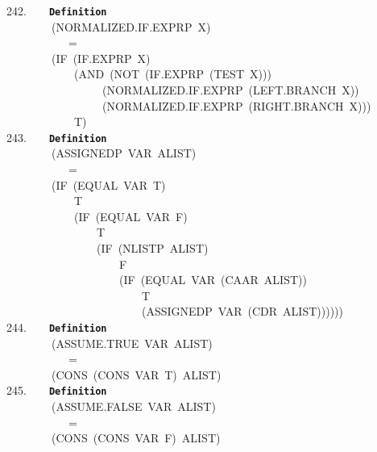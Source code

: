 \documentclass[11pt]{book}
\newenvironment{pubasis}{\begin{flushleft}\ttfamily\small}{\normalsize\rmfamily\end{flushleft}}
\newcommand{\axiomordefinition}[1]{\vspace{6pt}\texttt{\textbf{#1}}}
\begin{document}
\begin{pubasis}
242.~~~~\axiomordefinition{Definition}\\
~~~~~~~~(NOR\-MAL\-IZED.IF.EXPRP~X)\\
~~~~~~~~~~~=\\
~~~~~~~~(IF~(IF.EXPRP~X)\\
~~~~~~~~~~~~(AND~(NOT~(IF.EXPRP~(TEST~X)))\\
~~~~~~~~~~~~~~~~~(NOR\-MAL\-IZED.IF.EXPRP~(LEFT.BRANCH~X))\\
~~~~~~~~~~~~~~~~~(NOR\-MAL\-IZED.IF.EXPRP~(RIGHT.BRANCH~X)))\\
~~~~~~~~~~~~T)\\

243.~~~~\axiomordefinition{Definition}\\
~~~~~~~~(ASSIGNEDP~VAR~ALIST)\\
~~~~~~~~~~~=\\
~~~~~~~~(IF~(EQUAL~VAR~T)\\
~~~~~~~~~~~~T\\
~~~~~~~~~~~~(IF~(EQUAL~VAR~F)\\
~~~~~~~~~~~~~~~~T\\
~~~~~~~~~~~~~~~~(IF~(NLISTP~ALIST)\\
~~~~~~~~~~~~~~~~~~~~F\\
~~~~~~~~~~~~~~~~~~~~(IF~(EQUAL~VAR~(CAAR~ALIST))\\
~~~~~~~~~~~~~~~~~~~~~~~~T\\
~~~~~~~~~~~~~~~~~~~~~~~~(ASSIGNEDP~VAR~(CDR~ALIST))))))\\

244.~~~~\axiomordefinition{Definition}\\
~~~~~~~~(AS\-SUME.TRUE~VAR~ALIST)\\
~~~~~~~~~~~=\\
~~~~~~~~(CONS~(CONS~VAR~T)~ALIST)\\

245.~~~~\axiomordefinition{Definition}\\
~~~~~~~~(AS\-SUME.FALSE~VAR~ALIST)\\
~~~~~~~~~~~=\\
~~~~~~~~(CONS~(CONS~VAR~F)~ALIST)\\


\end{pubasis}
\end{document}

